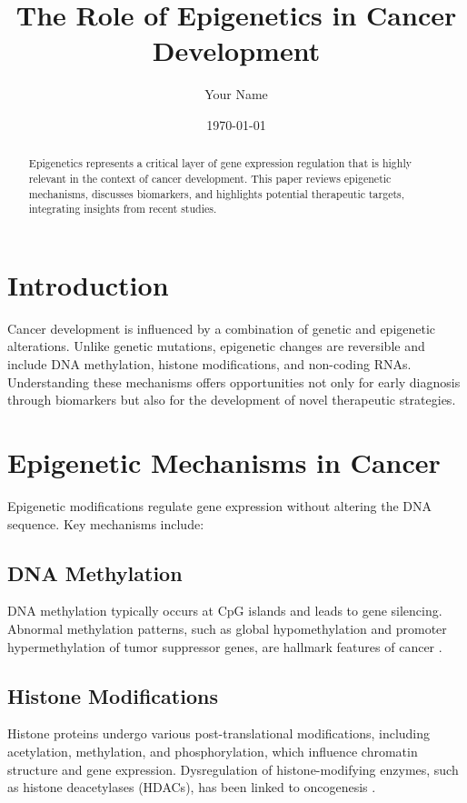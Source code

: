 \documentclass{article}
\title{The Role of Epigenetics in Cancer Development}
\author{Your Name}
\date{\today}
\begin{document}
\maketitle

\begin{abstract}
Epigenetics represents a critical layer of gene expression regulation that is highly relevant in the context of cancer development. This paper reviews epigenetic mechanisms, discusses biomarkers, and highlights potential therapeutic targets, integrating insights from recent studies.
\end{abstract}

\section{Introduction}
Cancer development is influenced by a combination of genetic and epigenetic alterations. Unlike genetic mutations, epigenetic changes are reversible and include DNA methylation, histone modifications, and non-coding RNAs. Understanding these mechanisms offers opportunities not only for early diagnosis through biomarkers but also for the development of novel therapeutic strategies.

\section{Epigenetic Mechanisms in Cancer}
Epigenetic modifications regulate gene expression without altering the DNA sequence. Key mechanisms include:

\subsection{DNA Methylation}
DNA methylation typically occurs at CpG islands and leads to gene silencing. Abnormal methylation patterns, such as global hypomethylation and promoter hypermethylation of tumor suppressor genes, are hallmark features of cancer \cite{Jones2002}.

\subsection{Histone Modifications}
Histone proteins undergo various post-translational modifications, including acetylation, methylation, and phosphorylation, which influence chromatin structure and gene expression. Dysregulation of histone-modifying enzymes, such as histone deacetylases (HDACs), has been linked to oncogenesis \cite{Sharma2010}.
\end{document}
